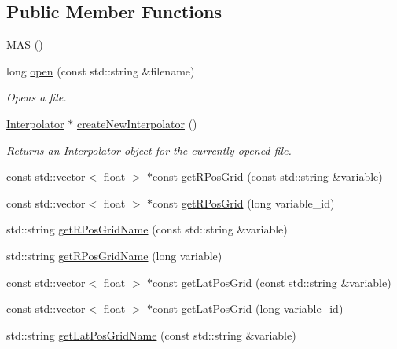 \subsection*{Public Member Functions}
\begin{DoxyCompactItemize}
\item 
\hyperlink{classccmc_1_1_m_a_s_ad78fa3f4aa33338fae7ec8b3b94a7cc7}{M\-A\-S} ()
\item 
long \hyperlink{classccmc_1_1_m_a_s_a054e168c8a692b724471c0c3c775dc25}{open} (const std\-::string \&filename)
\begin{DoxyCompactList}\small\item\em Opens a file.  \end{DoxyCompactList}\item 
\hyperlink{classccmc_1_1_interpolator}{Interpolator} $\ast$ \hyperlink{classccmc_1_1_m_a_s_a31c49cc43cb52378c439be07a81c98b8}{create\-New\-Interpolator} ()
\begin{DoxyCompactList}\small\item\em Returns an \hyperlink{classccmc_1_1_interpolator}{Interpolator} object for the currently opened file.  \end{DoxyCompactList}\item 
const std\-::vector$<$ float $>$ $\ast$const \hyperlink{classccmc_1_1_m_a_s_a122e13f77f5d100999b221f4e99969d5}{get\-R\-Pos\-Grid} (const std\-::string \&variable)
\item 
const std\-::vector$<$ float $>$ $\ast$const \hyperlink{classccmc_1_1_m_a_s_a4afe56f686e16528530b7b39d88965da}{get\-R\-Pos\-Grid} (long variable\-\_\-id)
\item 
std\-::string \hyperlink{classccmc_1_1_m_a_s_a12b2234a64300d51e5a7561a6233f7da}{get\-R\-Pos\-Grid\-Name} (const std\-::string \&variable)
\item 
std\-::string \hyperlink{classccmc_1_1_m_a_s_a2602b76e9b24ade052cb12831c79b871}{get\-R\-Pos\-Grid\-Name} (long variable)
\item 
const std\-::vector$<$ float $>$ $\ast$const \hyperlink{classccmc_1_1_m_a_s_a224892d7220189b0d6086bf3ab87759b}{get\-Lat\-Pos\-Grid} (const std\-::string \&variable)
\item 
const std\-::vector$<$ float $>$ $\ast$const \hyperlink{classccmc_1_1_m_a_s_a27e7abd169eb2d87d3f4f9dfe6396791}{get\-Lat\-Pos\-Grid} (long variable\-\_\-id)
\item 
std\-::string \hyperlink{classccmc_1_1_m_a_s_a10aaea12d1d40a1e53ca063027622f35}{get\-Lat\-Pos\-Grid\-Name} (const std\-::string \&variable)
\item 

\end{DoxyCompactItemize}
